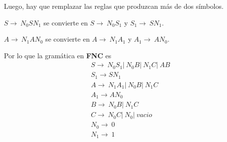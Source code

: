 \documentclass{article}
\begin{document}
\begin{enumerate}
\begin{enumerate}
        Luego, hay que remplazar las reglas que produzcan más de dos símbolos.

        $S \rightarrow \ N_0SN_1$ se convierte en $S \rightarrow \ N_0S_1$ y 
        $S_1 \rightarrow \ SN_1$.

       

        $A \rightarrow \ N_1AN_0$ se convierte en $A \rightarrow \ N_1A_1$ y 
        $A_1 \rightarrow \ AN_0$.


        Por lo que la gramática en \textbf{FNC} es 
        \begin{align*}
        	&S \rightarrow \ N_0S_1 |\ N_0B |\ N_1C |\ AB \\
        	&S_1 \rightarrow SN_1\\
        	&A \rightarrow \ N_1A_1 |\ N_0B |\ N_1C \\
        	&A_1 \rightarrow AN_0\\
        	&B \rightarrow \ N_0B |\ N_1C \\
        	&C \rightarrow \ N_0C |\ N_0 |\ vacio \\
        	&N_0 \rightarrow \ 0 \\
        	&N_1 \rightarrow \ 1
        \end{align*}
    \end{enumerate}
\end{enumerate}
\end{document}
